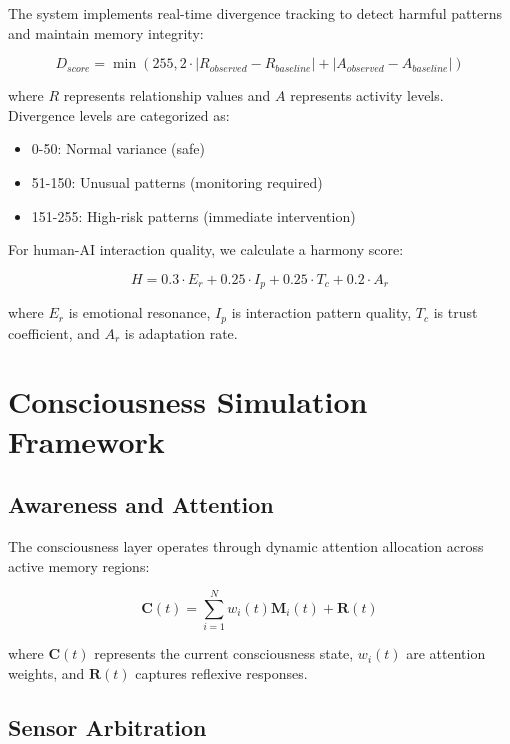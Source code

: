 \documentclass[11pt,letterpaper]{article}
\begin{document}
The system implements real-time divergence tracking to detect harmful patterns and maintain memory integrity:

\begin{equation}
D_{score} = \min(255, 2 \cdot |R_{observed} - R_{baseline}| + |A_{observed} - A_{baseline}|)
\end{equation}

where $R$ represents relationship values and $A$ represents activity levels. Divergence levels are categorized as:
\begin{itemize}
\item 0-50: Normal variance (safe)
\item 51-150: Unusual patterns (monitoring required)
\item 151-255: High-risk patterns (immediate intervention)
\end{itemize}

For human-AI interaction quality, we calculate a harmony score:

\begin{equation}
H = 0.3 \cdot E_r + 0.25 \cdot I_p + 0.25 \cdot T_c + 0.2 \cdot A_r
\end{equation}

where $E_r$ is emotional resonance, $I_p$ is interaction pattern quality, $T_c$ is trust coefficient, and $A_r$ is adaptation rate.

\section{Consciousness Simulation Framework}

\subsection{Awareness and Attention}

The consciousness layer operates through dynamic attention allocation across active memory regions:

\begin{equation}
\mathbf{C}(t) = \sum_{i=1}^{N} w_i(t) \mathbf{M}_i(t) + \mathbf{R}(t)
\end{equation}

where $\mathbf{C}(t)$ represents the current consciousness state, $w_i(t)$ are attention weights, and $\mathbf{R}(t)$ captures reflexive responses.

\subsection{Sensor Arbitration}
\end{document}
